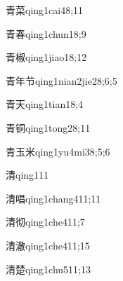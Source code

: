 \begin{verbete}{青菜}{qing1cai4}{8;11}
\end{verbete}

\begin{verbete}{青春}{qing1chun1}{8;9}
\end{verbete}

\begin{verbete}{青椒}{qing1jiao1}{8;12}
\end{verbete}

\begin{verbete}{青年节}{qing1nian2jie2}{8;6;5}
\end{verbete}

\begin{verbete}{青天}{qing1tian1}{8;4}
\end{verbete}

\begin{verbete}{青铜}{qing1tong2}{8;11}
\end{verbete}

\begin{verbete}{青玉米}{qing1yu4mi3}{8;5;6}
\end{verbete}

\begin{verbete}{清}{qing1}{11}
\end{verbete}

\begin{verbete}{清唱}{qing1chang4}{11;11}
\end{verbete}

\begin{verbete}{清彻}{qing1che4}{11;7}
\end{verbete}

\begin{verbete}{清澈}{qing1che4}{11;15}
\end{verbete}

\begin{verbete}{清楚}{qing1chu5}{11;13}
\end{verbete}


